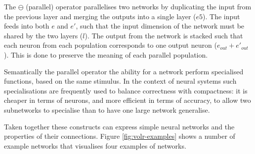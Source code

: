 The $\ominus$ (parallel) operator parallelises two networks by duplicating
the input from the previous layer and merging the outputs into a single
layer ($e5$).
The input feeds into both $e$ and $e'$, such that the input dimension of
the network must be shared by the two layers ($l$). 
The output from the network is stacked such that each neuron from each
population corresponds to one output neuron ($e_{out} + e'_{out}$).
This is done to preserve the meaning of each parallel population.

Semantically the parallel operator the ability for a network
perform specialised functions, based on the same stimulus.
In the context of neural systems such specialisations are frequently used
to balance correctness with compactness: it is cheaper in terms of neurons,
and more efficient in terms of accuracy,
to allow two subnetworks to specialise than to have one large network 
generalise.

\begin{comment} %
In the other end, the two layers are merged such that each output neuron
is represented individually in a population with the size $e + e'$.
By not entangling the output dimensions, the following layers can choose
to ignore parts of the input, irrespective of the other parallel layer.
This parallelisation represents the duplication that occurs
in neural circuits, where structurally similar sub-networks, that are
fed the same stimuli, appear to contribute with semantically different
information (see \ref{sec:ref}).
\end{comment}

Taken together these constructs can express simple neural networks and
the properties of their connections. 
Figure \ref{fig:volr-examples} shows a number of example networks
that visualises four examples of networks. 



\FloatBarrier
